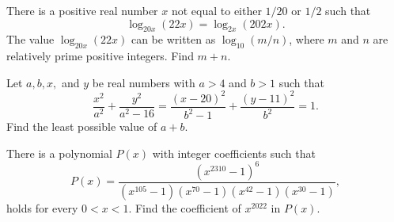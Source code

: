 %	












\begin{question}[name={2022 AIME II, \href{https://artofproblemsolving.com/community/c4p24447420}{Problem 4}}]
	There is a positive real number $x$ not equal to either ${1}/{20}$ or ${1}/{2}$ such that
	$$\log_{20x} (22x)=\log_{2x} (202x).$$
	The value $\log_{20x} (22x)$ can be written as $\log_{10} ({m}/{n})$, where $m$ and $n$ are relatively prime positive integers. Find $m+n$.
\end{question}


%	














\begin{question}[name={2022 AIME II, \href{https://artofproblemsolving.com/community/c4p24447217}{Problem 12}}]
	Let $a, b, x,$ and $y$ be real numbers with $a>4$ and $b>1$ such that
	$$\frac{x^2}{a^2}+\frac{y^2}{a^2-16}=\frac{(x-20)^2}{b^2-1}+\frac{(y-11)^2}{b^2}=1.$$
	Find the least possible value of $a+b$.
\end{question}


%	








\begin{question}[name={2022 AIME II, \href{https://artofproblemsolving.com/community/c4p24447196}{Problem 13}}]
	There is a polynomial $P(x)$ with integer coefficients such that
	$$P(x)=\frac{(x^{2310}-1)^6}{(x^{105}-1)(x^{70}-1)(x^{42}-1)(x^{30}-1)},$$
	holds for every $0<x<1$. Find the coefficient of $x^{2022}$ in $P(x)$.
\end{question}


%	








